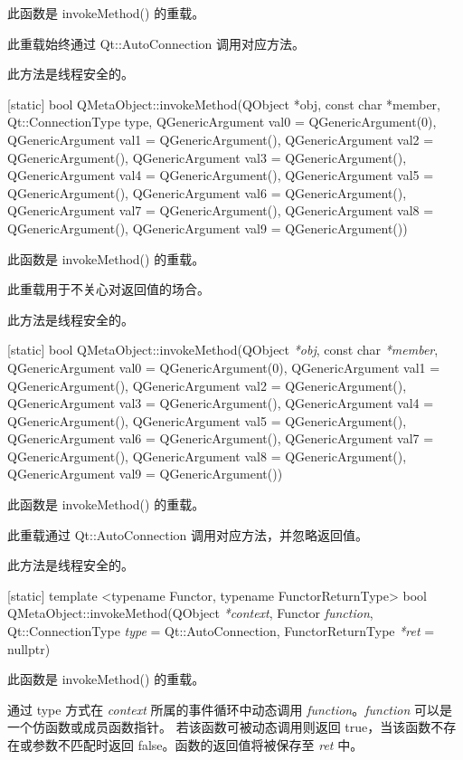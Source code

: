 此函数是 invokeMethod() 的重载。

此重载始终通过 Qt::AutoConnection 调用对应方法。

\begin{notice}
此方法是线程安全的。
\end{notice}

[static] bool QMetaObject::invokeMethod(QObject *obj, const char *member, Qt::ConnectionType type, QGenericArgument val0 = QGenericArgument(0), QGenericArgument val1 = QGenericArgument(), QGenericArgument val2 = QGenericArgument(), QGenericArgument val3 = QGenericArgument(), QGenericArgument val4 = QGenericArgument(), QGenericArgument val5 = QGenericArgument(), QGenericArgument val6 = QGenericArgument(), QGenericArgument val7 = QGenericArgument(), QGenericArgument val8 = QGenericArgument(), QGenericArgument val9 = QGenericArgument())

此函数是 invokeMethod() 的重载。

此重载用于不关心对返回值的场合。


\begin{notice}
此方法是线程安全的。
\end{notice}


[static] bool QMetaObject::invokeMethod(QObject \emph{*obj}, const char \emph{*member}, 
 QGenericArgument val0 = QGenericArgument(0), QGenericArgument val1 = QGenericArgument(),
  QGenericArgument val2 = QGenericArgument(), QGenericArgument val3 = QGenericArgument(),
   QGenericArgument val4 = QGenericArgument(), QGenericArgument val5 = QGenericArgument(), 
   QGenericArgument val6 = QGenericArgument(), QGenericArgument val7 = QGenericArgument(), 
   QGenericArgument val8 = QGenericArgument(), QGenericArgument val9 = QGenericArgument())

此函数是 invokeMethod() 的重载。

此重载通过 Qt::AutoConnection 调用对应方法，并忽略返回值。

\begin{notice}
此方法是线程安全的。
\end{notice}

[static] template <typename Functor, typename FunctorReturnType> bool QMetaObject::invokeMethod(QObject \emph{*context}, Functor \emph{function}, Qt::ConnectionType \emph{type} = Qt::AutoConnection, FunctorReturnType \emph{*ret} = nullptr)

此函数是 invokeMethod() 的重载。

通过 type 方式在 \emph{context} 所属的事件循环中动态调用 \emph{function}。\emph{function} 可以是一个仿函数或成员函数指针。
若该函数可被动态调用则返回 true，当该函数不存在或参数不匹配时返回 false。函数的返回值将被保存至 \emph{ret} 中。


